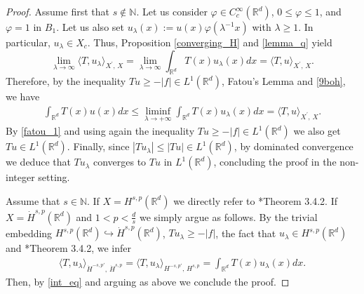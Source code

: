 \documentclass[letterpaper, 11pt,  reqno]{amsart}
\theoremstyle{definition}
\theoremstyle{remark}
\numberwithin{equation}{section}
\newcommand{\bbr}{\mathbb{R}}
\newcommand{\N}{{\mathbb N}}
\newcommand{\R}{{\mathbb R}}
\begin{document}
	\begin{proof}
	Assume first that $s\notin \N$. Let us consider  $\varphi\in C^{\infty}_c(\bbr^d)$, $0\le \varphi\le 1$, and $\varphi=1$ in $B_1$. Let us also set $u_\lambda(x):=u(x)\varphi(\lambda^{-1}x)$ with $\lambda\ge 1$. 
		In particular, $u_{\lambda}\in X_c$. Thus, Proposition \ref{converging_H} and \eqref{lemma_q}  yield
		\begin{equation}
		\label{9boh}
			\lim_{\lambda\to \infty}\langle T,u_\lambda\rangle_{X^{'},\, X} =\lim_{\lambda\to \infty}\int_{\bbr^d}T(x)u_\lambda(x)dx= \langle T,u\rangle_{X^{'},\, X}.
		\end{equation}
		Therefore,  by the inequality $Tu\ge -|f|\in L^{1}(\bbr^d)$,  Fatou's Lemma and \eqref{9boh}, we have
		\begin{equation}\label{fatou_1}
			\begin{split}
				\int_{\bbr^d}T(x)u(x)dx
				\le \liminf_{\lambda\to +\infty}\int_{\bbr^d}T(x)u_\lambda(x)dx
				=\langle T,u\rangle_{X^{'},\, X}.
			\end{split}
		\end{equation}
		By \eqref{fatou_1} and using again  the inequality $Tu\ge -|f|\in L^{1}(\bbr^d)$ we also get $Tu\in L^{1}(\bbr^d)$. Finally, since $|Tu_\lambda|\le |Tu|\in L^{1}(\bbr^d)$, by dominated convergence we deduce that
		$Tu_\lambda$ converges to $Tu$ in $L^{1}(\bbr^d)$, concluding the proof in the non-integer setting.
		
Assume that $s\in \N$. If $X=H^{s,p}(\R^d)$ we directly refer to \cite{Adams}*{Theorem 3.4.2}. If $X=\dot H^{s,p}(\R^d)$ and $1<p<\frac{d}{s}$ we simply argue as follows. By the trivial embedding $H^{s,p}(\R^d)\hookrightarrow  \dot H^{s,p}(\R^d)$, $Tu_{\lambda}\ge -|f|$, the fact that $u_\lambda\in H^{s,p}(\R^d)$ and \cite{Adams}*{Theorem 3.4.2}, we infer 
\begin{align}
\langle T,u_\lambda\rangle_{\dot{H}^{-s,p'},\, \dot{H}^{s,p}}=\langle T,u_\lambda\rangle_{{H}^{-s,p'},\, {H}^{s,p}}=\int_{\R^d}T(x)u_{\lambda}(x)dx.
\label{int_eq}
\end{align}
Then, by  \eqref{int_eq} and arguing as above we conclude the proof. 
	\end{proof}
\end{document}

